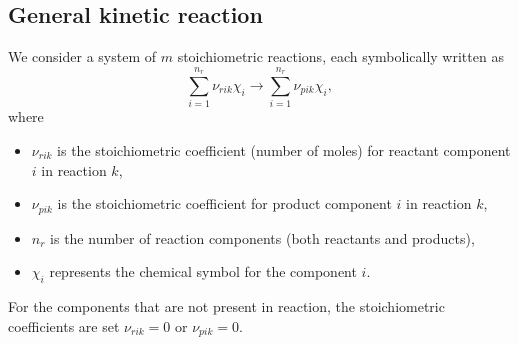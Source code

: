 %
%
%
%

\normalsize

\subsection{General kinetic reaction}
\label{sec:kinetic}
We consider a system of $m$ stoichiometric reactions, each symbolically written as
\begin{equation} \label{eqn:general_kinetic_reaction}
  \sum\limits_{i=1}^{n_r} \nu_{rik}\chi_{i} \rightarrow \sum\limits_{i=1}^{n_r} \nu_{pik} \chi_{i},
\end{equation}
where 
\begin{itemize}
  \item $\nu_{rik}$ \units{}{}{} is the stoichiometric coefficient (number of moles) 
        for reactant component $i$ in reaction $k$,
  \item $\nu_{pik}$ \units{}{}{} is the stoichiometric coefficient
        for product component $i$ in reaction $k$,
  \item $n_r$ is the number of reaction components (both reactants and products),
  \item $\chi_{i}$ represents the chemical symbol for the component $i$.
\end{itemize}
For the components that are not present in reaction, the stoichiometric coefficients are set
$\nu_{rik}=0$ or $\nu_{pik}=0$.

